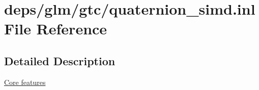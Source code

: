 \hypertarget{quaternion__simd_8inl}{}\section{deps/glm/gtc/quaternion\+\_\+simd.inl File Reference}
\label{quaternion__simd_8inl}


\subsection{Detailed Description}
\hyperlink{group__core}{Core features} 